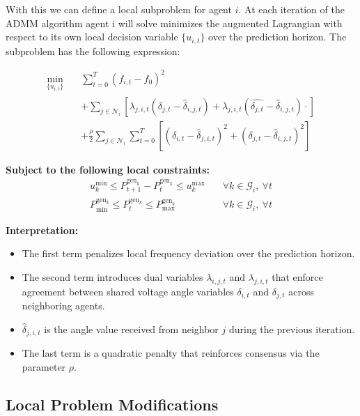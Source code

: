 \documentclass{article}
\begin{document}
With this we can define a local subproblem for agent $i$. At each iteration of the ADMM algorithm agent i will solve minimizes the augmented Lagrangian with respect to its own local decision variable $\{u_{i,t}\}$ over the prediction horizon. The subproblem has the following expression:

\begin{align}
    \min_{\{u_{i,t}\}} \quad & \sum_{t=0}^{T} (f_{i,t} - f_0)^2 \nonumber \\
    &+ \sum_{j \in \mathcal{N}_i} \left[ \lambda_{j,i,t}(\delta_{j,t} - \hat{\delta}_{i,j,t})  + \lambda_{j,i,t}(\hat{\delta_{j,t}} - \hat{\delta}_{i, j, t}) \cdot  \right] \nonumber \\
    &+ \frac{\rho}{2} \sum_{j \in \mathcal{N}_i} \sum_{t=0}^T \left[ (\delta_{i,t} - \hat{\delta}_{j,i,t})^2 + (\delta_{j,t} - \hat{\delta}_{i,j,t})^2 \right]
\end{align}

\textbf{Subject to the following local constraints:}
\begin{align}
    u^{\min}_k \leq P^{\text{gen}_k}_{t+1} - P^{\text{gen}_k}_t \leq u^{\max}_k \quad &\forall k \in \mathcal{G}_i,\ \forall t \\
    P^{\text{gen}_k}_{\min} \leq P^{\text{gen}_k}_t \leq P^{\text{gen}_k}_{\max} \quad &\forall k \in \mathcal{G}_i,\ \forall t
\end{align}

\textbf{Interpretation:}
\begin{itemize}
    \item The first term penalizes local frequency deviation over the prediction horizon.
    \item The second term introduces dual variables $\lambda_{i,j,t}$ and $\lambda_{j,i,t}$ that enforce agreement between shared voltage angle variables $\delta_{i,t}$ and $\delta_{j,t}$ across neighboring agents.
    \item $\hat{\delta}_{j,i,t}$ is the angle value received from neighbor $j$ during the previous iteration.
    \item The last term is a quadratic penalty that reinforces consensus via the parameter $\rho$.
\end{itemize}

\subsection{Local Problem Modifications}
\end{document}
